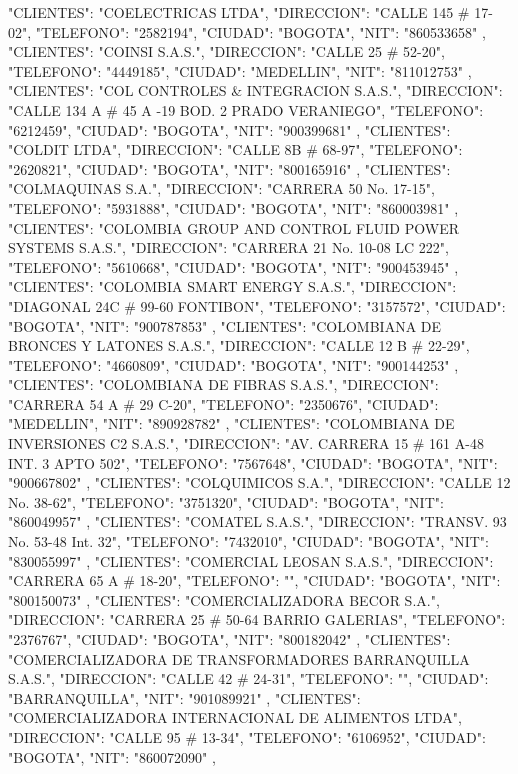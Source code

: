    {
   "CLIENTES": "COELECTRICAS LTDA",
   "DIRECCION": "CALLE 145 # 17-02",
   "TELEFONO": "2582194",
   "CIUDAD": "BOGOTA",
   "NIT": "860533658"
   },
   {
   "CLIENTES": "COINSI S.A.S.",
   "DIRECCION": "CALLE 25 # 52-20",
   "TELEFONO": "4449185",
   "CIUDAD": "MEDELLIN",
   "NIT": "811012753"
   },
   {
   "CLIENTES": "COL CONTROLES & INTEGRACION S.A.S.",
   "DIRECCION": "CALLE 134 A # 45 A -19 BOD. 2 PRADO VERANIEGO",
   "TELEFONO": "6212459",
   "CIUDAD": "BOGOTA",
   "NIT": "900399681"
   },
   {
   "CLIENTES": "COLDIT LTDA",
   "DIRECCION": "CALLE 8B # 68-97",
   "TELEFONO": "2620821",
   "CIUDAD": "BOGOTA",
   "NIT": "800165916"
   },
   {
   "CLIENTES": "COLMAQUINAS S.A.",
   "DIRECCION": "CARRERA 50 No. 17-15",
   "TELEFONO": "5931888",
   "CIUDAD": "BOGOTA",
   "NIT": "860003981"
   },
   {
   "CLIENTES": "COLOMBIA GROUP AND CONTROL FLUID POWER SYSTEMS S.A.S.",
   "DIRECCION": "CARRERA 21 No. 10-08 LC 222",
   "TELEFONO": "5610668",
   "CIUDAD": "BOGOTA",
   "NIT": "900453945"
   },
   {
   "CLIENTES": "COLOMBIA SMART ENERGY S.A.S.",
   "DIRECCION": "DIAGONAL 24C # 99-60 FONTIBON",
   "TELEFONO": "3157572",
   "CIUDAD": "BOGOTA",
   "NIT": "900787853"
   },
   {
   "CLIENTES": "COLOMBIANA DE BRONCES Y LATONES S.A.S.",
   "DIRECCION": "CALLE 12 B # 22-29",
   "TELEFONO": "4660809",
   "CIUDAD": "BOGOTA",
   "NIT": "900144253"
   },
   {
   "CLIENTES": "COLOMBIANA DE FIBRAS S.A.S.",
   "DIRECCION": "CARRERA 54 A # 29 C-20",
   "TELEFONO": "2350676",
   "CIUDAD": "MEDELLIN",
   "NIT": "890928782"
   },
   {
   "CLIENTES": "COLOMBIANA DE INVERSIONES C2 S.A.S.",
   "DIRECCION": "AV. CARRERA 15 # 161 A-48 INT. 3 APTO 502",
   "TELEFONO": "7567648",
   "CIUDAD": "BOGOTA",
   "NIT": "900667802"
   },
   {
   "CLIENTES": "COLQUIMICOS S.A.",
   "DIRECCION": "CALLE 12 No. 38-62",
   "TELEFONO": "3751320",
   "CIUDAD": "BOGOTA",
   "NIT": "860049957"
   },
   {
   "CLIENTES": "COMATEL S.A.S.",
   "DIRECCION": "TRANSV. 93 No. 53-48 Int. 32",
   "TELEFONO": "7432010",
   "CIUDAD": "BOGOTA",
   "NIT": "830055997"
   },
   {
   "CLIENTES": "COMERCIAL LEOSAN S.A.S.",
   "DIRECCION": "CARRERA 65 A # 18-20",
   "TELEFONO": "",
   "CIUDAD": "BOGOTA",
   "NIT": "800150073"
   },
   {
   "CLIENTES": "COMERCIALIZADORA BECOR S.A.",
   "DIRECCION": "CARRERA 25 # 50-64 BARRIO GALERIAS",
   "TELEFONO": "2376767",
   "CIUDAD": "BOGOTA",
   "NIT": "800182042"
   },
   {
   "CLIENTES": "COMERCIALIZADORA DE TRANSFORMADORES BARRANQUILLA S.A.S.",
   "DIRECCION": "CALLE 42 # 24-31",
   "TELEFONO": "",
   "CIUDAD": "BARRANQUILLA",
   "NIT": "901089921"
   },
   {
   "CLIENTES": "COMERCIALIZADORA INTERNACIONAL DE ALIMENTOS LTDA",
   "DIRECCION": "CALLE 95 # 13-34",
   "TELEFONO": "6106952",
   "CIUDAD": "BOGOTA",
   "NIT": "860072090"
   },
